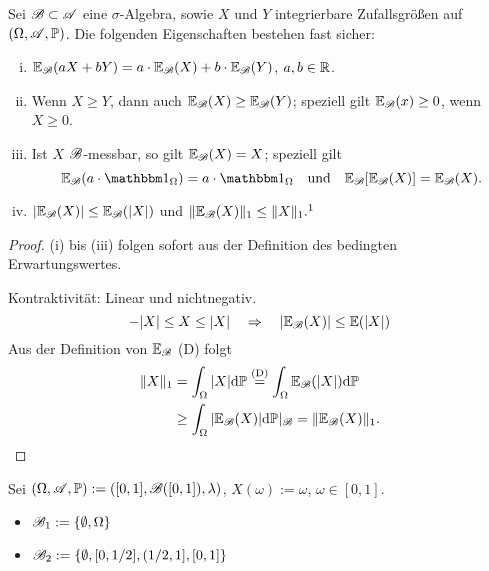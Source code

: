 \begin{thm}
  Sei $\mathscr{B} \subset \mathscr{A}$ eine $\sigma$-Algebra, sowie $X$ und $Y$ integrierbare
  Zufallsgrößen auf $(\Omega, \mathscr{A}, \mathbb{P})$. Die folgenden Eigenschaften bestehen
  fast sicher:
  \begin{enumerate}[(i)]
  \item $\mathbb{E}_{\mathscr{B}}( aX + bY ) = a \cdot \mathbb{E}_{\mathscr{B}}(X) + b \cdot \mathbb{E}_{\mathscr{B}}(Y)$, $a,b \in
    \mathbb{R}$.
  \item Wenn $X \ge Y$, dann auch $\mathbb{E}_{\mathscr{B}}(X) \ge \mathbb{E}_{\mathscr{B}}(Y)$; speziell gilt
    $\mathbb{E}_{\mathscr{B}}(x) \ge 0$, wenn $X \ge 0$.
  \item Ist $X$ $\mathscr{B}$-messbar, so gilt $\mathbb{E}_{\mathscr{B}}(X) = X$; speziell gilt
    \[ \pE_\mB( a \cdot \ind_\Omega) = a \cdot \ind_\Omega \quad \text{und}
      \quad \pE_\mB[ \pE_\mB(X) ] = \pE_\mB(X). \]
  \item $|\mathbb{E}_{\mathscr{B}}(X)| \le \mathbb{E}_{\mathscr{B}}(|X|)$ und $\|\pE_\mB(X)\|_1 \le \|X\|_1.\footnotemark$
  \end{enumerate}
\end{thm}

\begin{proof}
  (i) bis (iii) folgen sofort aus der Definition des bedingten Erwartungswertes.

  Kontraktivität: Linear und nichtnegativ.
  \[ - |X| \le X \le |X| \quad \Rightarrow \quad |\mathbb{E}_{\mathscr{B}}(X)| \le \mathbb{E}(|X|) \]
  Aus der Definition von $\mathbb{E}_{\mathscr{B}}$ (D) folgt
  \begin{align*}
  \|X\|_1 &= \int_\Omega |X| \mathrm{d} \mathbb{P} \overset{\text{(D)}}{=} \int_\Omega
            \mathbb{E}_{\mathscr{B}}(|X|) \mathrm{d} \mathbb{P} \\
          &\ge \int_\Omega |\mathbb{E}_{\mathscr{B}}(X)| \mathrm{d} \mathbb{P}|_{\mathscr{B}} = \| \mathbb{E}_{\mathscr{B}}(X) \|_1. \qedhere
  \end{align*}
\end{proof}

\begin{exmp*}
  Sei $(\Omega, \mathscr{A}, \mathbb{P}) := ([0,1], \mathscr{B}([0,1]), \lambda)$, $X(\omega) :=
  \omega$, $\omega \in [0,1]$.
  \begin{itemize}
  \item $\mathscr{B}_1 := \{ \emptyset, \Omega \}$
  \item $\mathscr{B}_2 := \{ \emptyset, [0,1/2], (1/2,1], [0,1] \}$
  \end{itemize}
\end{exmp*}

